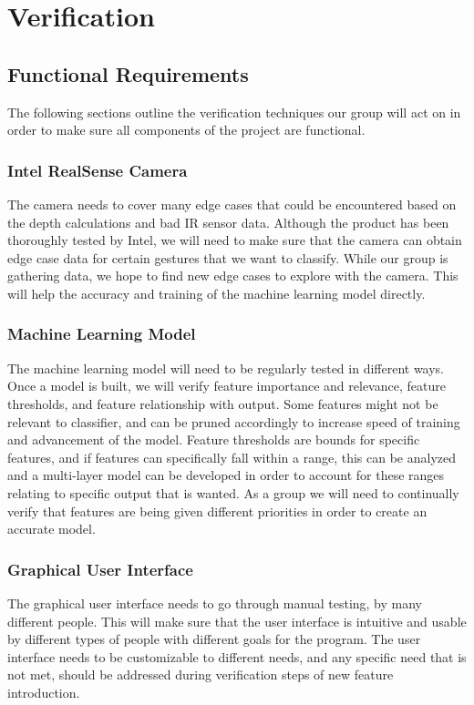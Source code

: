 \documentclass[onecolumn, draftclsnofoot,10pt, compsoc]{IEEEtran}
\begin{document}
\section{Verification}

\subsection{Functional Requirements}
The following sections outline the verification techniques our group will act on in order to make sure all components of the project are functional.

\subsubsection{Intel RealSense Camera}
The camera needs to cover many edge cases that could be encountered based on the depth calculations and bad IR sensor data. Although the product has been thoroughly tested by Intel, we will need to make sure that the camera can obtain edge case data for certain gestures that we want to classify. While our group is gathering data, we hope to find new edge cases to explore with the camera. This will help the accuracy and training of the machine learning model directly. 

\subsubsection{Machine Learning Model}
The machine learning model will need to be regularly tested in different ways. Once a model is built, we will verify feature importance and relevance, feature thresholds, and feature relationship with output. Some features might not be relevant to classifier, and can be pruned accordingly to increase speed of training and advancement of the model. Feature thresholds are bounds for specific features, and if features can specifically fall within a range, this can be analyzed and a multi-layer model can be developed in order to account for these ranges relating to specific output that is wanted. As a group we will need to continually verify that features are being given different priorities in order to create an accurate model.

\subsubsection{Graphical User Interface}
The graphical user interface needs to go through manual testing, by many different people. This will make sure that the user interface is intuitive and usable by different types of people with different goals for the program. The user interface needs to be customizable to different needs, and any specific need that is not met, should be addressed during verification steps of new feature introduction.
\end{document}
